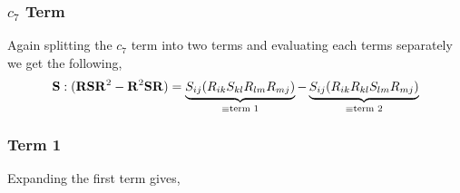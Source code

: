 \subsubsection{$c_7$ Term}
Again splitting the $c_{7}$ term into two terms and evaluating each terms
separately we get the following,
\begin{equation}
    \mathbf{S} : (\mathbf{R} \mathbf{S} \mathbf{R}^2 - \mathbf{R}^2 \mathbf{S} \mathbf{R}) =
                \underbrace{ S_{ij} (R_{ik} S_{kl} R_{lm} R_{mj})}_{\equiv \text{term 1}} - 
                \underbrace{ S_{ij} (R_{ik} R_{kl} S_{lm} R_{mj})}_{\equiv \text{term 2}}
\end{equation}
\subsubsection{Term 1}
Expanding the first term gives,
